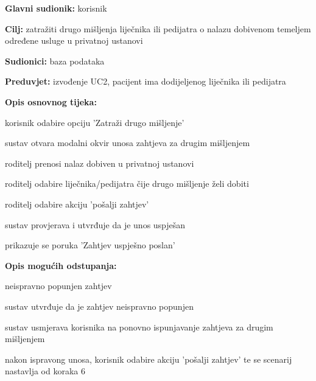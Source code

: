                     \noindent {}
					\begin{packed_item}
						\item \textbf{Glavni sudionik: }korisnik
						\item  \textbf{Cilj:} zatražiti drugo mišljenja liječnika ili pedijatra o nalazu dobivenom temeljem određene usluge u privatnoj ustanovi
						\item  \textbf{Sudionici:} baza podataka
						\item  \textbf{Preduvjet:} izvođenje UC2, pacijent ima dodijeljenog liječnika ili pedijatra
						\item  \textbf{Opis osnovnog tijeka:}
						
						\item[] \begin{packed_enum}
							\item korisnik odabire opciju 'Zatraži drugo mišljenje'
							\item sustav otvara modalni okvir unosa zahtjeva za drugim mišljenjem
							\item roditelj prenosi nalaz dobiven u privatnoj ustanovi
                            \item roditelj odabire liječnika/pedijatra čije drugo mišljenje želi dobiti
							\item roditelj odabire akciju 'pošalji zahtjev'
							\item sustav provjerava i utvrđuje da je unos uspješan
							\item prikazuje se poruka 'Zahtjev uspješno poslan'
						
						\end{packed_enum}
						
						\item  \textbf{Opis mogućih odstupanja:}
						
						\item[] \begin{packed_item}
                            \item[5.a] neispravno popunjen zahtjev
                            \item[] \begin{packed_enum}
                            	\item sustav utvrđuje da je zahtjev neispravno popunjen
								\item sustav usmjerava korisnika na ponovno ispunjavanje zahtjeva za drugim mišljenjem
								\item nakon ispravong unosa, korisnik odabire akciju 'pošalji zahtjev' te se scenarij nastavlja od koraka 6
							\end{packed_enum}
						\end{packed_item}
					\end{packed_item}


